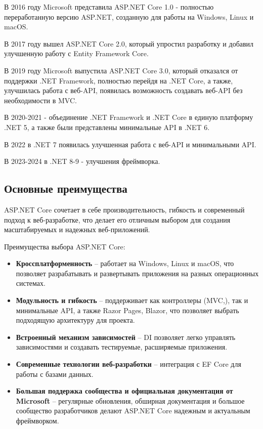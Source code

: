 \documentclass[a4paper,12pt]{report}
\begin{document}
В 2016 году Microsoft представила ASP.NET Core 1.0 - полностью переработанную версию ASP.NET, созданную для работы на Windows, Linux и macOS.\cite{announcing_asp_net_core_1_0}

В 2017 году вышел ASP.NET Core 2.0, который упростил разработку и добавил улучшенную работу с Entity Framework Core.\cite{announcing_asp_net_core_2_0}

В 2019 году Microsoft выпустила ASP.NET Core 3.0, который отказался от поддержки .NET Framework, полностью перейдя на .NET Core, 
а также, улучшилась работа с веб-\acs{API}, появилась возможность создавать веб-\acs{API} без необходимости в \acs{MVC}.\cite{announcing_asp_net_core_3_0}

В 2020-2021 - объединение .NET Framework и .NET Core в единую платформу .NET 5, а также были представлены минимальные \acs{API} в .NET 6.\cite{announcing_dot_net_5_0}\cite{announcing_dot_net_6_0}

В 2022 в .NET 7 появилась улучшенная работа с веб-\acs{API} и минимальными \acs{API}.\cite{announcing_dot_net_7_0}

В 2023-2024 в .NET 8-9 - улучшения фреймворка.\cite{announcing_dot_net_8_0}\cite{announcing_dot_net_9_0}

\subsection{Основные преимущества}

ASP.NET Core сочетает в себе производительность, гибкость и современный подход к веб-разработке, что делает его отличным выбором 
для создания масштабируемых и надежных веб-приложений.

Преимущества выбора ASP.NET Core:
\begin{itemize}
    \item
        \textbf{Кроссплатформенность} -- работает на Windows, Linux и macOS, что позволяет разрабатывать и развертывать приложения на разных операционных системах.
    \item 
        \textbf{Модульность и гибкость} -- поддерживает как контроллеры (\acs{MVC},), так и минимальные \acs{API}, а также Razor Pages, Blazor, что позволяет выбрать 
        подходящую архитектуру для проекта.
    \item
        \textbf{Встроенный механизм зависимостей} -- \acs{DI} позволяет легко управлять зависимостями и создавать тестируемые, расширяемые приложения.
    \item
        \textbf{Современные технологии веб-разработки} -- интеграция с \acs{EF} Core для работы с базами данных.
    \item
        \textbf{Большая поддержка сообщества и официальная документация от Microsoft} -- регулярные обновления, обширная документация и большое сообщество 
        разработчиков делают ASP.NET Core надежным и актуальным фреймворком.
\end{itemize}
\end{document}
